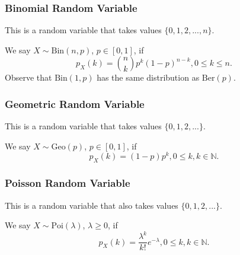 \subsubsection{Binomial Random Variable} This is a random variable that takes  values $\{0,1,2,...,n\}$.

We say $X \sim \textrm{Bin}(n,p)$, $p \in [0,1]$, if
$$ p_X(k)= \binom{n}{k}p^k(1-p)^{n-k},  0\leq k \leq n. $$
Observe that $\textrm{Bin}(1,p)$ has the same distribution as $\textrm{Ber}(p)$.

\subsubsection{Geometric Random Variable} This is a random variable that takes  values $\{0,1,2,...\}$.

We say $X \sim \textrm{Geo}(p)$, $p \in [0,1]$, if
$$ p_X(k)= (1-p) p^{k},  0\leq k, k \in \mathbb{N}. $$

\subsubsection{Poisson Random Variable} This is a random variable that also takes  values $\{0,1,2,...\}$.

We say $X \sim \textrm{Poi}(\lambda)$, $\lambda \geq 0$, if
$$ p_X(k)=  \frac{\lambda^{k}}{k!}e^{-\lambda},  0\leq k, k \in \mathbb{N}. $$
